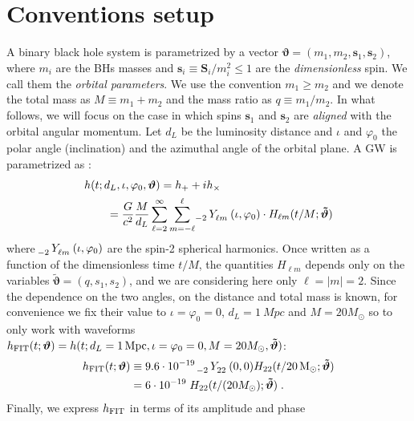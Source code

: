 \section{Conventions setup}
\label{sec:setup}
A binary black hole system is parametrized by a vector $ \boldsymbol{\vartheta} = (m_1,m_2, \mathbf{s}_1,\mathbf{s}_2) $, where $m_i$ are the 
BHs masses and $\mathbf{s}_i \equiv \mathbf{S}_i/m_i^2 \leq 1$ are the 
\textit{dimensionless} spin. We call them the \textit{orbital parameters}.
We use the convention $m_1\geq m_2$ and we denote the total mass as $M\equiv m_1+m_2$
and the mass ratio as $q\equiv m_1/m_2$.
In what follows, we will focus on the case in which spins $\mathbf{s}_1$ and $\mathbf{s}_2$ are \textit{aligned} with the orbital angular momentum. 
Let $d_L$ be the luminosity distance and $\iota$ and $\varphi_0$ the polar angle (inclination) and the azimuthal angle of the orbital plane.
A GW is parametrized as \cite[eq. II.6]{ajith2011data}:
\begin{align} \label{eq:h_parametrization}
	&h(t; d_L,\iota,\varphi_0, \boldsymbol{\vartheta}) = h_+ + i h_\times \nonumber \\
		&\qquad= \frac{G}{c^2} \frac{M}{d_L}\sum_{\ell = 2}^{\infty} \sum_{m = -\ell}^{\ell} \tensor[_{-2}]{Y}{_{\ell m}}(\iota, \varphi_0) \cdot H_{\ell m}(t/M; \boldsymbol{\tilde{\vartheta}})
\end{align}
where $\tensor[_{-2}]{Y}{_{\ell m}}(\iota, \varphi_0)$ are the spin-2 spherical harmonics. 
Once written as a function of the dimensionless time $t/M$, the quantities $H_{\ell m}$ 
depends only on the variables $\tilde{\boldsymbol{\vartheta}} = (q, s_1, s_2)$, and we
are considering here only $\ell=|m|=2$.
Since the dependence on the two angles, on the distance and total mass is known, 
for convenience we fix their value to ${\iota = \varphi_0 = 0}$, ${d_L = \SI{1}{Mpc}}$ 
and $M = 20M_\odot$ so to only work with waveforms ${h_{\rm FIT}(t; \boldsymbol{\vartheta}) = h(t; d_L = \SI{1}{Mpc}, \iota = \varphi_0 = 0, 
M = 20M_\odot, \boldsymbol{\tilde{\vartheta}}) }$:
\begin{align}  
	h_{\rm FIT}(t; \boldsymbol{\vartheta}) &\equiv 9.6 \cdot 10^{-19} \; \tensor[_{-2}]{Y}{_{2 2}}(0,0) H_{22}(t/\SI{20}{M_\odot}; \boldsymbol{\tilde{\vartheta}})  \nonumber \\
	&= 6 \cdot 10^{-19} \; H_{22}(t/(20M_\odot); \boldsymbol{\tilde{\vartheta}}) \label{eq:h_std} \; .
\end{align}
Finally, we express  $h_{\rm FIT}$ in terms of its amplitude and phase
